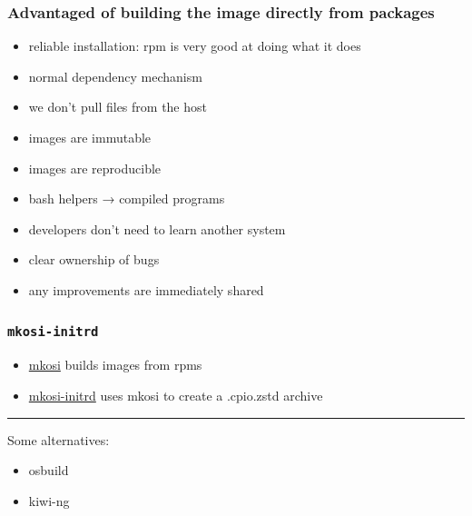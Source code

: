 \documentclass[]{beamer}
\begin{document}





\begin{frame}
   \frametitle{Advantaged of building the image directly from packages}

  \begin{itemize}
  \item reliable installation: rpm is very good at doing what it does
  \item normal dependency mechanism
    \pause
  \item we don't pull files from the host
    \pause
  \item images are immutable
  \item images are reproducible
    \pause
  \item bash helpers → compiled programs
  \item developers don't need to learn another system
    \pause
  \item clear ownership of bugs
  \item any improvements are immediately shared
  \end{itemize}
\end{frame}

\begin{frame}
  \frametitle{\texttt{mkosi-initrd}}

  \begin{itemize}
    \item \href{https://github.com/systemd/mkosi}{mkosi} builds images from rpms

    \item \href{https://github.com/systemd/mkosi-initrd}{mkosi-initrd} uses mkosi to create a .cpio.zstd archive
  \end{itemize}

  \bigskip

  \hrule

  \bigskip
  \pause

  Some alternatives:
  \begin{itemize}
  \item osbuild
  \item kiwi-ng
  \end{itemize}
\end{frame}
\end{document}
